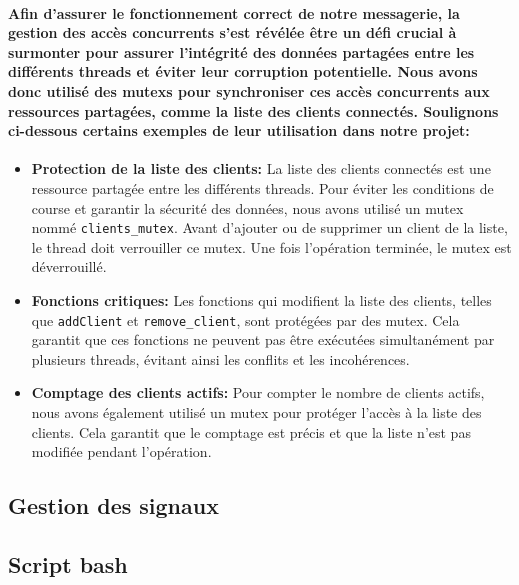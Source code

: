 \documentclass[utf8]{article}
\begin{document}
\paragraph{Afin d'assurer le fonctionnement correct de notre messagerie, la gestion des accès concurrents s'est révélée être un défi crucial à surmonter pour assurer 
l'intégrité des données partagées entre les différents threads et éviter leur corruption potentielle. Nous avons donc utilisé des mutexs pour synchroniser ces accès 
concurrents aux ressources partagées, comme la liste des clients connectés. Soulignons ci-dessous certains exemples de leur utilisation dans notre projet:}
\begin{itemize} %
    \item \textbf{Protection de la liste des clients:} La liste des clients connectés est une ressource partagée entre les différents threads. Pour éviter les conditions de course et garantir la sécurité des données, 
    nous avons utilisé un mutex nommé \texttt{clients\_mutex}. Avant d'ajouter ou de supprimer un client de la liste, le thread doit verrouiller ce mutex. Une fois l'opération terminée, le mutex est déverrouillé.
    \item \textbf{Fonctions critiques:} Les fonctions qui modifient la liste des clients, telles que \texttt{addClient} et \texttt{remove\_client}, sont protégées par des mutex. Cela garantit que ces fonctions ne peuvent pas être exécutées simultanément par plusieurs threads, évitant ainsi les conflits et les incohérences.
    \item \textbf{Comptage des clients actifs:} Pour compter le nombre de clients actifs, nous avons également utilisé un mutex pour protéger l'accès à la liste des clients. Cela garantit que le comptage est précis et que la liste n'est pas modifiée pendant l'opération.
\end{itemize}

\subsection{Gestion des signaux}
\paragraph{}

\subsection{Script bash}
\end{document}
